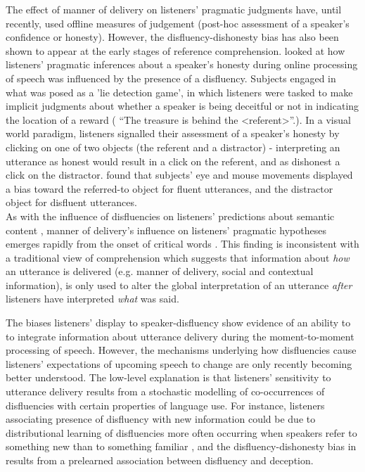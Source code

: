 \documentclass[man]{apa6}
\begin{document}
The effect of manner of delivery on listeners' pragmatic judgments have, until recently, used offline measures of judgement (post-hoc assessment of a speaker's confidence or honesty). 
However, the disfluency-dishonesty bias has also been shown to appear at the early stages of reference comprehension. 
\citet{Loy2016}looked at how listeners' pragmatic inferences about a speaker's honesty during online processing of speech was influenced by the presence of a disfluency. 
Subjects engaged in what was posed as a 'lie detection game', in which listeners were tasked to make implicit judgments about whether a speaker is being deceitful or not in indicating the location of a reward ( ``The treasure is behind the \textless referent\textgreater ''.). 
In a visual world paradigm, listeners signalled their assessment of a speaker's honesty by clicking on one of two objects (the referent and a distractor) - interpreting an utterance as honest would result in a click on the referent, and as dishonest a click on the distractor. 
\citet{Loy2016} found that subjects' eye and mouse movements displayed a bias toward the referred-to object for fluent utterances, and the distractor object for disfluent utterances.\\

As with the influence of disfluencies on listeners' predictions about semantic content \citep{Arnold2004, Arnold2007, Barr2001}, manner of delivery's influence on listeners' pragmatic hypotheses emerges rapidly from the onset of critical words \citep{Loy2016}. 
This finding is inconsistent with a traditional view \citep{Blank1988} of comprehension which suggests that information about \textit{how} an utterance is delivered (e.g. manner of delivery, social and contextual information), is only used to alter the global interpretation of an utterance \textit{after} listeners have interpreted \textit{what} was said. 

The biases listeners' display to speaker-disfluency show evidence of an ability to to integrate information about utterance delivery during the moment-to-moment processing of speech. 
However, the mechanisms underlying how disfluencies cause listeners' expectations of upcoming speech to change are only recently becoming better understood. 
The low-level explanation is that listeners' sensitivity to utterance delivery results from a stochastic modelling of co-occurrences of disfluencies with certain properties of language use. 
For instance, listeners associating presence of disfluency with new information could be due to distributional learning of disfluencies more often occurring when speakers refer to something new than to something familiar \citep{Arnold2004, Barr2001}, and the disfluency-dishonesty bias in \citet{Loy2016} results from a prelearned association between disfluency and deception.\\
\end{document}
